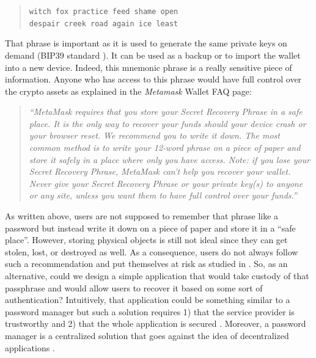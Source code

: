 \documentclass[runningheads]{llncs}
\begin{document}
\begin{quote}
\begin{center}
{\tt witch fox practice feed shame open}\\
{\tt despair creek road again ice least}
\end{center}
\end{quote}

That phrase is important as it is used to generate the same private keys on demand (BIP39 standard \cite{palatinus2013mnemonic}). It can be used as a backup or to import the wallet into a new device. Indeed, this mnemonic phrase is a really sensitive piece of information. Anyone who has access to this phrase would have full control over the crypto assets as explained in the {\em Metamask} Wallet FAQ page:

\begin{quote}
{\em ``MetaMask requires that you store your Secret Recovery Phrase in a safe place. It is the only way to recover your funds should your device crash or your browser reset. We recommend you to write it down. The most common method is to write your 12-word phrase on a piece of paper and store it safely in a place where only you have access. Note: if you lose your Secret Recovery Phrase, MetaMask can’t help you recover your wallet. Never give your Secret Recovery Phrase or your private key(s) to anyone or any site, unless you want them to have full control over your funds.''}\\
\end{quote}

As written above, users are not supposed to remember that phrase like a password but instead write it down on a piece of paper and store it in a ``safe place''. However, storing physical objects is still not ideal since they can get stolen, lost, or destroyed as well. As a consequence, users do not always follow such a recommendation and put themselves at risk as studied in \cite{voskobojnikov2021u}. So, as an alternative, could we design a simple application that would take custody of that passphrase and would allow users to recover it based on some sort of authentication? Intuitively, that application could be something similar to a password manager but such a solution requires 1) that the service provider is trustworthy and 2) that the whole application is secured \cite{li2014emperor}. Moreover, a password manager is a centralized solution that goes against the idea of decentralized applications \cite{buterin2017ethereum,cai2018decentralized}.\\
\end{document}
